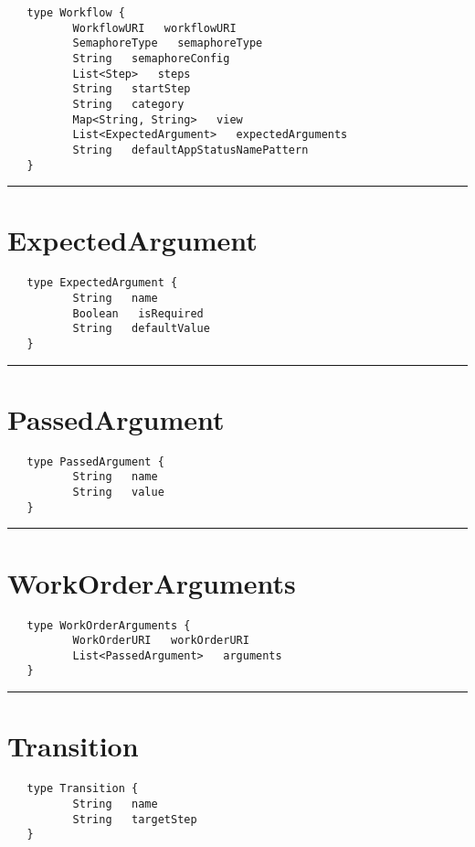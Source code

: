 \begin{verbatim}
   type Workflow {
          WorkflowURI   workflowURI
          SemaphoreType   semaphoreType
          String   semaphoreConfig
          List<Step>   steps
          String   startStep
          String   category
          Map<String, String>   view
          List<ExpectedArgument>   expectedArguments
          String   defaultAppStatusNamePattern
   }
\end{verbatim}

\rule{15cm}{2pt}
\section{ExpectedArgument}
\label{type:ExpectedArgument}

\begin{verbatim}
   type ExpectedArgument {
          String   name
          Boolean   isRequired
          String   defaultValue
   }
\end{verbatim}

\rule{15cm}{2pt}
\section{PassedArgument}
\label{type:PassedArgument}

\begin{verbatim}
   type PassedArgument {
          String   name
          String   value
   }
\end{verbatim}

\rule{15cm}{2pt}
\section{WorkOrderArguments}
\label{type:WorkOrderArguments}

\begin{verbatim}
   type WorkOrderArguments {
          WorkOrderURI   workOrderURI
          List<PassedArgument>   arguments
   }
\end{verbatim}

\rule{15cm}{2pt}
\section{Transition}
\label{type:Transition}

\begin{verbatim}
   type Transition {
          String   name
          String   targetStep
   }
\end{verbatim}

